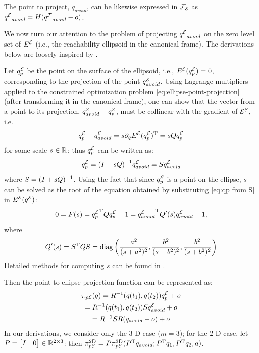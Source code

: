 \documentclass[journal]{IEEEtran}  %
\begin{document}
The point to project, $q_{avoid}$, can be likewise expressed in $\mathcal{F}_{\mathcal{E}}$ as ${q^{\mathcal{E}}}_{avoid} =  H ({q^{\mathcal{F}}}_{avoid}-o)$.

  We now turn our attention to the problem of projecting ${q^{\mathcal{E}}}_{avoid}$ on the zero level set of $E^{\mathcal{E}}$ (i.e., the reachability ellipsoid in the canonical frame). The derivations below are loosely inspired by \cite{eberly}.

  Let $q^{\mathcal{E}}_p$ be the point on the surface of the ellipsoid, i.e., ${E^{\mathcal{E}}}(q^{\mathcal{E}}_p) = 0$, corresponding to the projection of the point $q^{\mathcal{E}}_{avoid}$. Using Lagrange multipliers applied to the constrained optimization problem \eqref{eq:ellipse-point-projection} (after transforming it in the canonical frame), one can show that the vector from a point to its projection, $q^{\mathcal{E}}_{avoid}- q^{\mathcal{E}}_p$, must be collinear with the gradient of ${\mathcal{E}^{\mathcal{E}}}$, i.e.
  \begin{equation}
    q^{\mathcal{E}}_p- q^{\mathcal{E}}_{avoid} = s \partial_q {E^{\mathcal{E}}}(q^{\mathcal{E}}_p)^\mathrm{T} = s Q q^{\mathcal{E}}_p
  \end{equation}
  for some scale $s\in\mathbb{R}^{}{}$;
  thus $q^{\mathcal{E}}_p$ can be written as:
  \begin{equation}\label{eq:qp from S}
    q^{\mathcal{E}}_{p} = {(I+sQ)}^{-1} q^{\mathcal{E}}_{avoid} = S q^{\mathcal{E}}_{avoid}
  \end{equation}
  where $S=(I+sQ)^{-1}$.
  Using the fact that since $q^{\mathcal{E}}_p$ is a point on the ellipse, $s$ can be solved as the root of the equation obtained by substituting \eqref{eq:qp from S} in ${E^{\mathcal{E}}}({q^{\mathcal{E}}})$:
  \begin{equation}
    0=F(s)={q^{\mathcal{E}}_p}^\mathrm{T} Q q^{\mathcal{E}}_p-1={q^{\mathcal{E}}_{avoid}}^\mathrm{T} Q'(s) q^{\mathcal{E}}_{avoid} -1,
  \end{equation}
  where
  \begin{equation}
    Q'(s) =S^\mathrm{T} Q S = \operatorname{diag}\left(\frac{a^{2}}{(s+a^{2})^2}, \frac{b^{2}}{(s+b^{2})^2},\frac{b^{2}}{(s+b^{2})^2}\right)
  \end{equation}
 Detailed methods for computing $s$ can be found in \cite{eberly}. 
 
  Then the point-to-ellipse projection function can be represented as:
  \begin{multline}\label{equ:Point2EllipseProjection}
    \pi_{p\mathcal{E}}(q)= R^{-1}(q(t_1),q(t_2))q^{\mathcal{E}}_p+o \\
    = R^{-1}(q(t_1),q(t_2))Sq^{\mathcal{E}}_{avoid}+o\\
    = R^{-1}S R ( q_{avoid}- o)+o
  \end{multline}
  In our derivations, we consider only the 3-D case ($m=3$); for the 2-D case, let $P=\begin{bmatrix}I & 0\end{bmatrix}\in\mathbb{R}^{2\times 3}{}$: then $\pi_{p\mathcal{E}}^{\textrm{2D}}=P\pi_{p\mathcal{E}}^{\textrm{3D}}(P^\mathrm{T} q_{avoid}; P^\mathrm{T} q_1, P^\mathrm{T} q_2,a)$.
\end{document}
